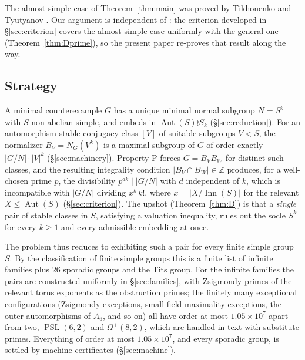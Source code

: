 \documentclass[11pt]{amsart}
\theoremstyle{definition}
\theoremstyle{remark}
\DeclareMathOperator{\Inn}{Inn}
\DeclareMathOperator{\Aut}{Aut}
\DeclareMathOperator{\PSL}{PSL}
\newcommand{\Z}{\mathbb{Z}}
\begin{document}
The almost simple case of Theorem~\ref{thm:main} was proved by Tikhonenko
and Tyutyanov \cite{TT2010}. Our argument is independent of \cite{TT2010}:
the criterion developed in \S\ref{sec:criterion} covers the almost simple
case uniformly with the general one (Theorem~\ref{thm:Dprime}), so the
present paper re-proves that result along the way.

\subsection*{Strategy}
A minimal counterexample $G$ has a unique minimal normal subgroup
$N=S^k$ with $S$ non-abelian simple, and embeds in $\Aut(S)\wr S_k$
(\S\ref{sec:reduction}). For an automorphism-stable conjugacy class $[V]$
of suitable subgroups $V<S$, the normalizer $B_V=N_G(V^k)$ is a maximal
subgroup of $G$ of order exactly $|G/N|\cdot|V|^k$
(\S\ref{sec:machinery}). Property $\mathrm{P}$ forces $G=B_VB_W$ for
distinct such classes, and the resulting integrality condition
$|B_V\cap B_W|\in\Z$ produces, for a well-chosen prime $p$, the
divisibility $p^{dk}\mid |G/N|$ with $d$ independent of $k$, which is
incompatible with $|G/N|$ dividing $x^k\,k!$, where $x=|X/\Inn(S)|$ for
the relevant $X\leq\Aut(S)$ (\S\ref{sec:criterion}). The upshot
(Theorem~\ref{thm:D}) is that a \emph{single} pair of stable classes in
$S$, satisfying a valuation inequality, rules out the socle $S^k$ for
every $k\geq 1$ and every admissible embedding at once.

The problem thus reduces to exhibiting such a pair for every finite simple
group $S$. By the classification of finite simple groups this is a finite
list of infinite families plus $26$ sporadic groups and the Tits group.
For the infinite families the pairs are constructed uniformly in
\S\ref{sec:families}, with Zsigmondy primes of the relevant torus
exponents as the obstruction primes; the finitely many exceptional
configurations (Zsigmondy exceptions, small-field maximality exceptions,
the outer automorphisms of $A_6$, and so on) all have order at most
$1.05\times 10^{7}$ apart from two, $\PSL(6,2)$ and $\Omega^+(8,2)$,
which are handled in-text with substitute primes. Everything of order at most
$1.05\times10^{7}$, and every sporadic group, is settled by machine
certificates (\S\ref{sec:machine}).
\end{document}
